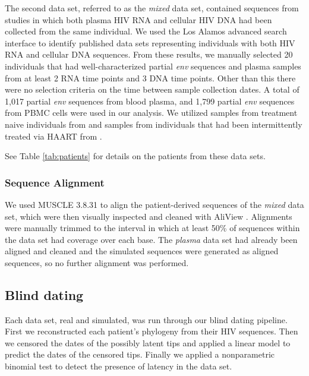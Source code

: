 \documentclass[12pt]{article}
\begin{document}
The second data set, referred to as the {\em mixed} data set, contained sequences from studies in which both plasma HIV RNA and cellular HIV DNA had been collected from the same individual.
We used the Los Alamos advanced search interface \citep{LosAlamos} to identify published data sets representing individuals with both HIV RNA and cellular DNA sequences.
From these results, we manually selected 20 individuals that had well-characterized partial {\em env} sequences and plasma samples from at least 2 RNA time points and 3 DNA time points. 
Other than this there were no selection criteria on the time between sample collection dates. 
A total of 1,017 partial {\em env} sequences from blood plasma, and 1,799 partial {\em env} sequences from PBMC cells were used in our analysis. 
We utilized samples from treatment naive individuals from \cite{Shankarappa99, Novitsky09} and samples from individuals that had been intermittently treated via HAART from \cite{Llewellyn06,Fischer04}. 

See Table \ref{tab:patients} for details on the patients from these data sets.

\subsubsection * {Sequence Alignment} \label{subsec:seqalign}
We used MUSCLE 3.8.31 \citep{Muscle04} to align the patient-derived sequences of the \emph{mixed} data set, which were then visually inspected and cleaned with AliView \citep{AliView14}. 
Alignments were manually trimmed to the interval in which at least  50\% of sequences within the data set had coverage over each base.
The \emph{plasma} data set had already been aligned and cleaned \citep{McCloskey14} and the simulated sequences were generated as aligned sequences, so no further alignment was performed.

\subsection * {Blind dating}
Each data set, real and simulated, was run through our blind dating pipeline.
First we reconstructed each patient's phylogeny from their HIV sequences.
Then we censored the dates of the possibly latent tips and applied a linear model to predict the dates of the censored tips.
Finally we applied a nonparametric binomial test to detect the presence of latency in the data set.
\end{document}
